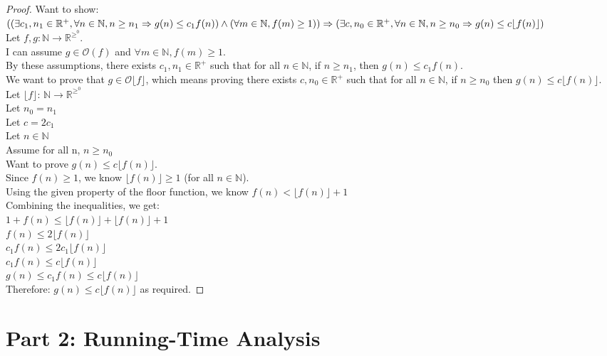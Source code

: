 \documentclass[11pt]{article}
\begin{document}
\begin{enumerate}
\begin{proof}
Want to show: $((\exists c_1, n_1 \in \mathbb{R}^+, \forall n \in \mathbb{N}, n \ge n_1 \Rightarrow g(n) \le c_1 f(n)) \land (\forall m \in \mathbb{N}, f(m) \ge 1)) \\
\Rightarrow (\exists c, n_0 \in \mathbb{R}^+, \forall n \in \mathbb{N}, n \ge n_0 \Rightarrow g(n) \le c\lfloor f(n) \rfloor )$ \\
Let $f, g : \mathbb{N} \rightarrow \mathbb{R}^\ge^0 $. \\
I can assume $g \in \mathcal{O}(f)$ and $\forall m \in \mathbb{N}, f(m) \ge 1 $. \\
By these assumptions, there exists $c_1, n_1 \in \mathbb{R}^+$ such that for all $n \in \mathbb{N}$, if $n \ge n_1$, then $g(n) \le  c_1f(n)$. \\
We want to prove that $g \in \mathcal{O}\lfloor f \rfloor$, which means proving there exists $c, n_0 \in \mathbb{R}^+$ such that for all $n \in \mathbb{N}$, if $n \ge n _0$ then $g(n) \le c\lfloor f(n) \rfloor$. \\
Let $\lfloor f \rfloor$: $\mathbb{N} \rightarrow \mathbb{R}^\ge^0$ \\
Let $n_0 = n_1$ \\
Let $c = 2c_1$ \\
Let $n \in \mathbb{N}$ \\
Assume for all n, $n \ge n _0$ \\
Want to prove $g(n) \le c\lfloor f(n) \rfloor$. \\
Since $f(n) \ge 1$, we know $\lfloor f(n) \rfloor \ge 1$ (for all $n \in \mathbb{N} $). \\
Using the given property of the floor function, we know $f(n) < \lfloor f(n) \rfloor + 1$ \\
Combining the inequalities, we get: \\
$1 + f(n) \le \lfloor f(n) \rfloor + \lfloor f(n) \rfloor + 1 $ \\
$f(n) \le 2 \lfloor f(n) \rfloor$ \\
$c_1 f(n) \le 2c_1 \lfloor f(n) \rfloor$ \\
$c_1 f(n) \le c \lfloor f(n) \rfloor$ \\
$g(n) \le c_1f(n) \le c \lfloor f(n) \rfloor$ \\
Therefore: $g(n) \le c \lfloor f(n) \rfloor$ as required.
\end{proof}
\end{enumerate}

\newpage


\section*{Part 2: Running-Time Analysis}
\end{document}
